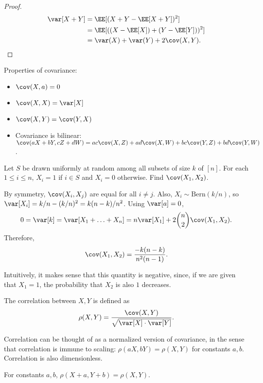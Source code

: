 \begin{proof}
\begin{align*}
    \var[X+Y] &= \EE[(X+Y - \EE[X+Y])^2] \\
    &= \EE[((X-\EE[X]) + (Y-\EE[Y]))^2]\\
    &= \var(X) + \var(Y) + 2\cov(X,Y).
\end{align*}
\end{proof}
Properties of covariance:
\begin{itemize}
    \item $\cov(X,a)=0$
    \item $\cov(X,X)=\var[X]$
    \item $\cov(X,Y) = \cov(Y,X)$
    \item Covariance is bilinear: $\cov(aX+bY, cZ+dW) = ac\cov(X,Z) + ad\cov(X,W) + bc\cov(Y,Z) + bd\cov(Y,W)$.
\end{itemize}

\begin{example}
\exlabel

Let $S$ be drawn uniformly at random among all subsets of size $k$ of $[n]$. For each $1\leq i\leq n$, $X_i=1$ if $i\in S$ and $X_i=0$ otherwise. Find $\cov(X_1, X_2)$. 
\end{example}

By symmetry, $\cov(X_i,X_j)$ are equal for all $i\neq j$. Also, $X_i\sim \text{Bern}(k/n)$, so $\var[X_i] = k/n - (k/n)^2 = k(n-k)/n^2$. Using $\var[a] = 0$, 
\[0 = \var[k] = \var[X_1 + \hdots + X_n] = n\var[X_1] + 2\binom{n}{2}\cov(X_1, X_2).\]
Therefore,
\[\cov(X_1, X_2) = \frac{-k(n-k)}{n^2(n-1)}.\]

Intuitively, it makes sense that this quantity is negative, since, if we are given that $X_1=1$, the probability that $X_2$ is also $1$ decreases. 

\begin{definition}

The \ac{correlation} between $X,Y$ is defined as 
\[\rho(X,Y) = \frac{\cov(X,Y)}{\sqrt{\var[X]\cdot \var[Y]}}.\]
\end{definition}

Correlation can be thought of as a normalized version of covariance, in the sense that correlation is immune to scaling: $\rho(aX, bY) = \rho(X,Y)$ for constants $a,b$. Correlation is also dimensionless. 

\begin{theorem}

For constants $a,b$, $\rho(X+a, Y+b) = \rho(X,Y)$.
\end{theorem}

